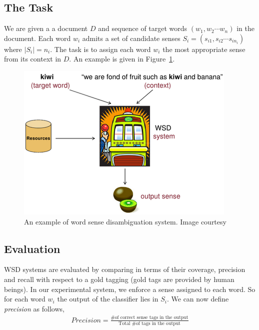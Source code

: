 \documentclass[12pt,letterpaper]{article}
\newcommand{\blue}[1]{\textcolor{RoyalBlue}{#1}}
\newcommand{\instructions}[1]{\blue{\textit{#1}}}
\begin{document}
\subsection{The Task}
\label{sec:task}
We are given a a document $D$ and sequence of target words $(w_1,w_2 \cdots w_n)$ in the document. Each word $w_i$ admits a set of candidate senses $S_i=(s_{i1},s_{i2} \cdots s_{in_i})$ where $|S_i|= n_i$. The task is to assign each word $w_i$ the most appropriate sense from its context in $D$.  An example is given in Figure~\ref{fig:1}.

\begin{figure}[H]
\centering
\includegraphics[scale=0.8]{wsd.png}
\caption{An example of word sense disambiguation system. Image courtesy ~\protect\cite{navilgiblog}}
\label{fig:1}
\end{figure}

\subsection{Evaluation}
WSD systems are evaluated by comparing in terms of their coverage, precision and recall with respect to a gold tagging (gold tags are provided by human beings). In our experimental system, we enforce a sense assigned to each word. So for each word $w_i$ the output of the classifier lies in $S_i$. We can now define \textit{precision} as follows,
\begin{align*}
Precision = \frac{\text{\# of correct sense tags in the output}}{\text{Total \# of tags in the output}}\\
\end{align*}
\end{document}
